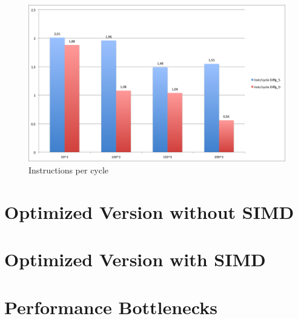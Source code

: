 \documentclass[12pt,a4paper]{article}
\begin{document}
\begin{figure}
	\centering
	\includegraphics[width=1.0\linewidth]{Benchmark/Instrcycle}
	\caption{Instructions per cycle}
	\label{fig:instrcycle}
\end{figure}


\section{Optimized Version without SIMD}
\section{Optimized Version with SIMD}
\section{Performance Bottlenecks}
\end{document}

